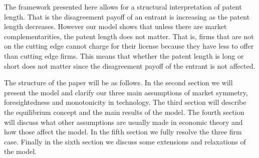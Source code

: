 \documentclass{article}
\begin{document}
The framework presented here allows for a structural interpretation of patent length. That is the disagreement payoff of an entrant is increasing as the patent length decreases. However our model shows that unless there are market complementarities, the patent length does not matter. That is, firms that are not on the cutting edge cannot charge for their license because they have less to offer than cutting edge firms. This means that whether the patent length is long or short does not matter since the disagreement payoff of the entrant is not affected. 

The structure of the paper will be as follows. In the second section we will present the model and clarify our three main assumptions of market symmetry, foresightedness and monotonicity in technology.  The third section will describe the equilibrium concept and the main results of the model. The fourth section will discuss what other assumptions are usually made in economic theory and how those affect the model. In the fifth section we fully resolve the three firm case. Finally in the sixth section we discuss some extensions and relaxations of the model. 
\end{document}
